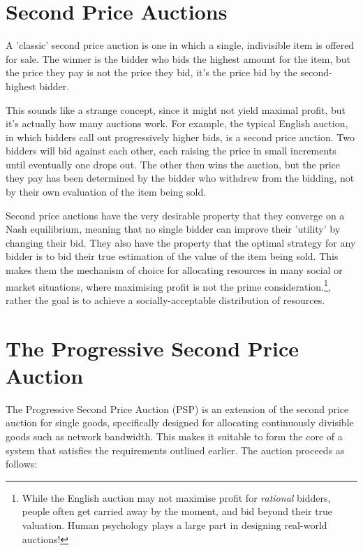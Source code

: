 \section{Second Price Auctions}

A 'classic' second price auction is one in which a single, indivisible item is offered for sale. The winner is the bidder who bids the highest amount for the item, but the price they pay is not the price they bid, it's the price bid by the second-highest bidder.

This sounds like a strange concept, since it might not yield maximal profit, but it's actually how many auctions work. For example, the typical English auction, in which bidders call out progressively higher bids, is a second price auction. Two bidders will bid against each other, each raising the price in small increments until eventually one drops out. The other then wins the auction, but the price they pay has been determined by the bidder who withdrew from the bidding, not by their own evaluation of the item being sold.

Second price auctions have the very desirable property that they converge on a Nash equilibrium, meaning that no single bidder can improve their 'utility' by changing their bid. They also have the property that the optimal strategy for any bidder is to bid their true estimation of the value of the item being sold. This makes them the mechanism of choice for allocating resources in many social or market situations, where maximising profit is not the prime consideration.\footnote{While the English auction may not maximise profit for {\it rational} bidders, people often get carried away by the moment, and bid beyond their true valuation. Human psychology plays a large part in designing real-world auctions!}, rather the goal is to achieve a socially-acceptable distribution of resources.

\section{The Progressive Second Price Auction}
The Progressive Second Price Auction (PSP)\cite{PSP} is an extension of the second price auction for single goods, specifically designed for allocating continuously divisible goods such as network bandwidth. This makes it suitable to form the core of a system that satisfies the requirements outlined earlier. The auction proceeds as follows:

